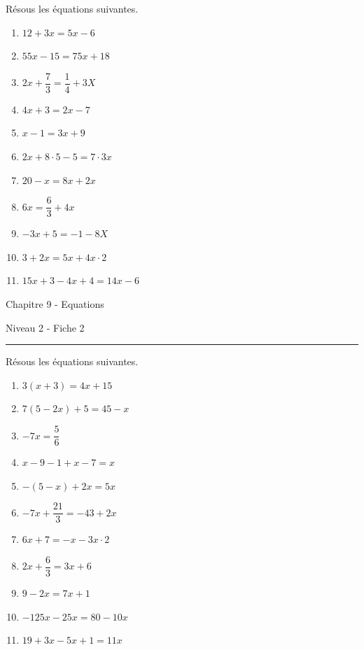 \documentclass[12pt,parskip=half-, twoside=semi]{scrartcl}
\begin{document}
\begin{exercise}
  Résous les équations suivantes.
    \begin{enumerate}[itemsep=0.4cm]
    \item \(12+3x=5x-6\)
    \item \(55x-15=75x+18\)
    \item \(2x+\dfrac{7}{3}=\dfrac{1}{4}+3X\)
    \item \(4x+3=2x-7\)
    \item \(x-1=3x+9\)
    \item \(2x+8\cdot 5-5=7\cdot 3x\)
    \item $20-x = 8x + 2x$
    \item $6x = \dfrac{6}{3}+4x$
    \item $- 3x + 5 = - 1 - 8X$
    \item $3 + 2x = 5x + 4x \cdot 2$
    \item \(15x+3-4x+4=14x-6\)
    \end{enumerate}
\end{exercise}


\newpage


\begin{center}
    \bfseries
    \begin{Huge}
      Chapitre 9 - Equations
    \end{Huge}
    \smallbreak
    \begin{large}
      Niveau 2  - Fiche 2
    \end{large}
    \smallbreak
    \rule[10pt]{.5\linewidth}{1 pt}
  \end{center}
  \setcounter{exercise}{0}

\begin{exercise}
    Résous les équations suivantes.
    \begin{enumerate}[itemsep=0.4cm]
    \item $3(x + 3) = 4x + 15$
    \item $7(5 - 2x)+5 = 45 -x$
    \item $- 7x = \dfrac{5}{6}$
    \item $x - 9 -1 + x - 7 = x$
    \item $- (5 - x) + 2x = 5x$
    \item \(-7x+\dfrac{21}{3}=-43+2x\)
    \item \(6x+7=-x-3x \cdot 2  \)
    \item \( 2x+\dfrac{6}{3}=3x+6\)
    \item \(9-2x=7x+1\)
    \item \(-125x-25x=80-10x \)
    \item \(19+3x-5x+1=11x\)
  \end{enumerate}
\end{exercise}
\end{document}
